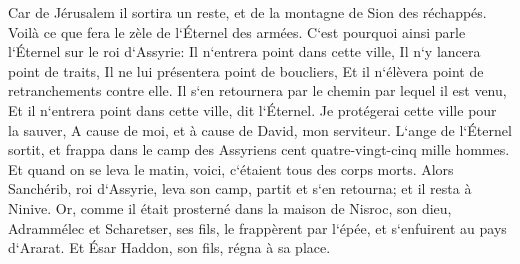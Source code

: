 \verse Car de Jérusalem il sortira un reste, et de la montagne de Sion des réchappés. Voilà ce que fera le zèle de l`Éternel des armées. 
\verse C`est pourquoi ainsi parle l`Éternel sur le roi d`Assyrie: Il n`entrera point dans cette ville, Il n`y lancera point de traits, Il ne lui présentera point de boucliers, Et il n`élèvera point de retranchements contre elle. 
\verse Il s`en retournera par le chemin par lequel il est venu, Et il n`entrera point dans cette ville, dit l`Éternel. 
\verse Je protégerai cette ville pour la sauver, A cause de moi, et à cause de David, mon serviteur. 
\verse L`ange de l`Éternel sortit, et frappa dans le camp des Assyriens cent quatre-vingt-cinq mille hommes. Et quand on se leva le matin, voici, c`étaient tous des corps morts. 
\verse Alors Sanchérib, roi d`Assyrie, leva son camp, partit et s`en retourna; et il resta à Ninive. 
\verse Or, comme il était prosterné dans la maison de Nisroc, son dieu, Adrammélec et Scharetser, ses fils, le frappèrent par l`épée, et s`enfuirent au pays d`Ararat. Et Ésar Haddon, son fils, régna à sa place. 

